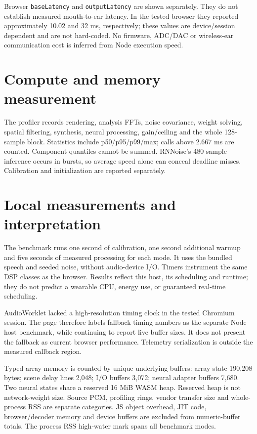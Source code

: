 \documentclass[11pt,a4paper]{article}
\begin{document}
Browser \texttt{baseLatency} and \texttt{outputLatency} are shown separately. They do not establish measured mouth-to-ear latency. In the tested browser they reported approximately 10.02 and 32 ms, respectively; these values are device/session dependent and are not hard-coded. No firmware, ADC/DAC or wireless-ear communication cost is inferred from Node execution speed.

\section{Compute and memory measurement}
The profiler records rendering, analysis FFTs, noise covariance, weight solving, spatial filtering, synthesis, neural processing, gain/ceiling and the whole 128-sample block. Statistics include p50/p95/p99/max; calls above 2.667 ms are counted. Component quantiles cannot be summed. RNNoise's 480-sample inference occurs in bursts, so average speed alone can conceal deadline misses. Calibration and initialization are reported separately.

\newpage
\section{Local measurements and interpretation}
\small


The benchmark runs one second of calibration, one second additional warmup and five seconds of measured processing for each mode. It uses the bundled speech and seeded noise, without audio-device I/O. Timers instrument the same DSP classes as the browser. Results reflect this host, its scheduling and runtime; they do not predict a wearable CPU, energy use, or guaranteed real-time scheduling.

AudioWorklet lacked a high-resolution timing clock in the tested Chromium session. The page therefore labels fallback timing numbers as the separate Node host benchmark, while continuing to report live buffer sizes. It does not present the fallback as current browser performance. Telemetry serialization is outside the measured callback region.

Typed-array memory is counted by unique underlying buffers: array state 190,208 bytes; scene delay lines 2,048; I/O buffers 3,072; neural adapter buffers 7,680. Two neural states share a reserved 16 MiB WASM heap. Reserved heap is not network-weight size. Source PCM, profiling rings, vendor transfer size and whole-process RSS are separate categories. JS object overhead, JIT code, browser/decoder memory and device buffers are excluded from numeric-buffer totals. The process RSS high-water mark spans all benchmark modes.
\end{document}
